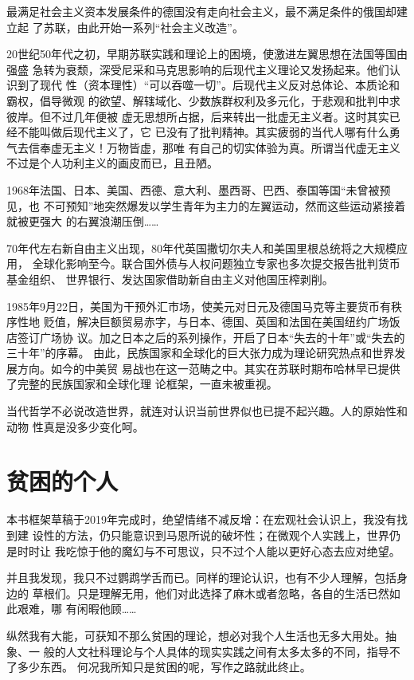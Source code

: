 最满足社会主义资本发展条件的德国没有走向社会主义，最不满足条件的俄国却建立起
了苏联，由此开始一系列“社会主义改造”。

20世纪50年代之初，早期苏联实践和理论上的困境，使激进左翼思想在法国等国由强盛
急转为衰颓，深受尼采和马克思影响的后现代主义理论又发扬起来。他们认识到了现代
性（资本理性）“可以吞噬一切”。后现代主义反对总体论、本质论和霸权，倡导微观
的欲望、解辖域化、少数族群权利及多元化，于悲观和批判中求彼岸。但不过几年便被
虚无思想所占据，后来转出一批虚无主义者。这时其实已经不能叫做后现代主义了，它
已没有了批判精神。其实疲弱的当代人哪有什么勇气去信奉虚无主义！万物皆虚，那唯
有自己的切实体验为真。所谓当代虚无主义不过是个人功利主义的画皮而已，且丑陋。

1968年法国、日本、美国、西德、意大利、墨西哥、巴西、泰国等国“未曾被预见，也
不可预知”地突然爆发以学生青年为主力的左翼运动，然而这些运动紧接着就被更强大
的右翼浪潮压倒……

70年代左右新自由主义出现，80年代英国撒切尔夫人和美国里根总统将之大规模应用，
全球化影响至今。联合国外债与人权问题独立专家也多次提交报告批判货币基金组织、
世界银行、发达国家借助新自由主义对他国压榨剥削。

1985年9月22日，美国为干预外汇市场，使美元对日元及德国马克等主要货币有秩序性地
贬值，解决巨额贸易赤字，与日本、德国、英国和法国在美国纽约广场饭店签订广场协
议。加之日本之后的系列操作，开启了日本“失去的十年”或“失去的三十年”的序幕。
由此，民族国家和全球化的巨大张力成为理论研究热点和世界发展方向。如今的中美贸
易战也在这一范畴之中。其实在苏联时期布哈林早已提供了完整的民族国家和全球化理
论框架，一直未被重视。

当代哲学不必说改造世界，就连对认识当前世界似也已提不起兴趣。人的原始性和动物
性真是没多少变化呵。

\section*{贫困的个人}

本书框架草稿于2019年完成时，绝望情绪不减反增：在宏观社会认识上，我没有找到建
设性的方法，仍只能意识到马恩所说的破坏性；在微观个人实践上，世界仍是时时让
我吃惊于他的魔幻与不可思议，只不过个人能以更好心态去应对绝望。

并且我发现，我只不过鹦鹉学舌而已。同样的理论认识，也有不少人理解，包括身边的
草根们。只是理解无用，他们对此选择了麻木或者忽略，各自的生活已然如此艰难，哪
有闲暇他顾……

纵然我有大能，可获知不那么贫困的理论，想必对我个人生活也无多大用处。抽象、一
般的人文社科理论与个人具体的现实实践之间有太多太多的不同，指导不了多少东西。
何况我所知只是贫困的呢，写作之路就此终止。


